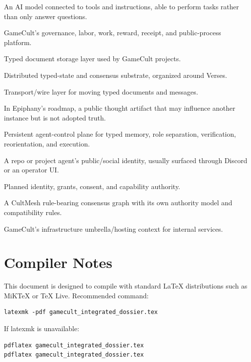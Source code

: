 \documentclass[11pt,oneside]{report}
\begin{document}
\begin{description}[leftmargin=2.5cm,style=nextline]
  \item[Agent] An AI model connected to tools and instructions, able to perform tasks rather than only answer questions.
  \item[Bifrost] GameCult's governance, labor, work, reward, receipt, and public-process platform.
  \item[CultCache] Typed document storage layer used by GameCult projects.
  \item[CultMesh] Distributed typed-state and consensus substrate, organized around Verses.
  \item[CultNet] Transport/wire layer for moving typed documents and messages.
  \item[Dream] In Epiphany's roadmap, a public thought artifact that may influence another instance but is not adopted truth.
  \item[Epiphany] Persistent agent-control plane for typed memory, role separation, verification, reorientation, and execution.
  \item[Persona] A repo or project agent's public/social identity, usually surfaced through Discord or an operator UI.
  \item[Heimdall] Planned identity, grants, consent, and capability authority.
  \item[Verse] A CultMesh rule-bearing consensus graph with its own authority model and compatibility rules.
  \item[Yggdrasil] GameCult's infrastructure umbrella/hosting context for internal services.
\end{description}

\chapter{Compiler Notes}

This document is designed to compile with standard \LaTeX{} distributions such as MiKTeX or TeX Live. Recommended command:

\begin{verbatim}
latexmk -pdf gamecult_integrated_dossier.tex
\end{verbatim}

If latexmk is unavailable:

\begin{verbatim}
pdflatex gamecult_integrated_dossier.tex
pdflatex gamecult_integrated_dossier.tex
\end{verbatim}
\end{document}
